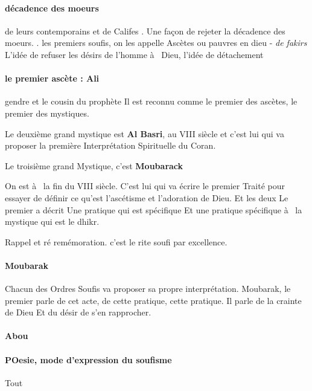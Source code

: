 \paragraph{décadence des moeurs}
   de leurs contemporains et de 
Califes .
Une façon de rejeter la décadence 
des moeurs.   . les premiers soufis, on les appelle 
Ascètes ou pauvres en dieu  - \textit{
de fakirs 
} L'idée de refuser les désirs de l'homme à  Dieu, l'idée de détachement 



\paragraph{le premier ascète : Ali} gendre et le cousin du prophète 
Il est reconnu comme le premier des ascètes, le premier des mystiques.

Le deuxième grand mystique est \textbf{Al Basri},  au VIII siècle et c'est lui qui  va proposer la première 
Interprétation Spirituelle 
du Coran.

Le troisième grand 
Mystique, c'est \textbf{Moubarack} 
 
On est à  la fin du VIII  siècle.  C'est lui qui  va écrire le premier 
Traité pour essayer de définir ce qu'est l'ascétisme et l'adoration 
de Dieu.
Et les deux  Le premier a décrit 
Une pratique qui  est spécifique 
Et une pratique spécifique à  la mystique qui  est le dhikr.  
\begin{Def}[Dhikr]
    Rappel et ré remémoration. c'est le rite soufi par excellence.
\end{Def}
\paragraph{Moubarak} Chacun des 
Ordres 
Soufis 
va proposer  sa propre interprétation. Moubarak, le premier parle de cet acte, de cette pratique, cette pratique. Il parle 
de la crainte de Dieu 
Et du désir de 
s'en rapprocher.

\paragraph{Abou}

\paragraph{POesie, mode d'expression du soufisme}
Tout 

